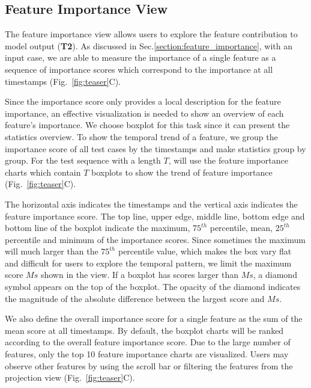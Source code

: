 \subsection{Feature Importance View}
The feature importance view allows users to explore the feature contribution to model output (\textbf{T2}).
As discussed in Sec.\ref{section:feature_importance}, with an input case, we are able to measure the importance of a single feature as a sequence of importance scores which correspond to the importance at all timestamps (Fig.~\ref{fig:teaser}C). 

Since the importance score only provides a local description for the feature importance, an effective visualization is needed to show an overview of each feature's importance. We choose boxplot for this task since it can present the statistics overview. To show the temporal trend of a feature, we group the importance score of all test cases by the timestamps and make statistics group by group. For the test sequence with a length $T$, will use the feature importance charts which contain $T$ boxplots to show the trend of feature importance (Fig.~\ref{fig:teaser}C).

The horizontal axis indicates the timestamps and the vertical axis indicates the feature importance score. The top line, upper edge, middle line, bottom edge and bottom line of the boxplot indicate the maximum,  $75^{th}$ percentile, mean, $25^{th}$ percentile and minimum of the importance scores.  Since sometimes the maximum will much larger than the $75^{th}$  percentile value, which makes the box vary flat and difficult for users to explore the temporal pattern, we limit the maximum score $Ms$ shown in the view. If a boxplot has scores larger than $Ms$, a diamond symbol appears on the top of the boxplot. The opacity of the diamond indicates the magnitude of the absolute difference between the largest score and $Ms$.    

We also define the overall importance score for a single feature as the sum of the mean score at all timestamps. By default, the boxplot charts will be ranked according to the overall feature importance score. Due to the large number of features, only the top 10 feature importance charts are visualized. Users may observe other features by using the scroll bar or filtering the features from the projection view (Fig.~\ref{fig:teaser}C). 

